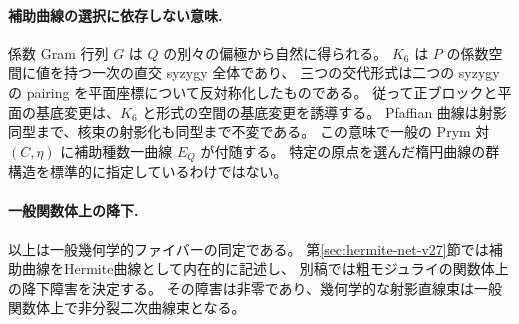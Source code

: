 \paragraph{補助曲線の選択に依存しない意味.}
係数 Gram 行列 $G$ は $Q$ の別々の偏極から自然に得られる。
$K_6$ は $P$ の係数空間に値を持つ一次の直交 syzygy 全体であり、
三つの交代形式は二つの syzygy の pairing を平面座標について反対称化したものである。
従って正ブロックと平面の基底変更は、$K_6$ と形式の空間の基底変更を誘導する。
Pfaffian 曲線は射影同型まで、核束の射影化も同型まで不変である。
この意味で一般の Prym 対 $(C,\eta)$ に補助種数一曲線 $E_Q$ が付随する。
特定の原点を選んだ楕円曲線の群構造を標準的に指定しているわけではない。

\paragraph{一般関数体上の降下.}
以上は一般幾何学的ファイバーの同定である。
第\ref{sec:hermite-net-v27}節では補助曲線をHermite曲線として内在的に記述し、
別稿\cite{PaperVI}では粗モジュライの関数体上の降下障害を決定する。
その障害は非零であり、幾何学的な射影直線束は一般関数体上で非分裂二次曲線束となる。
